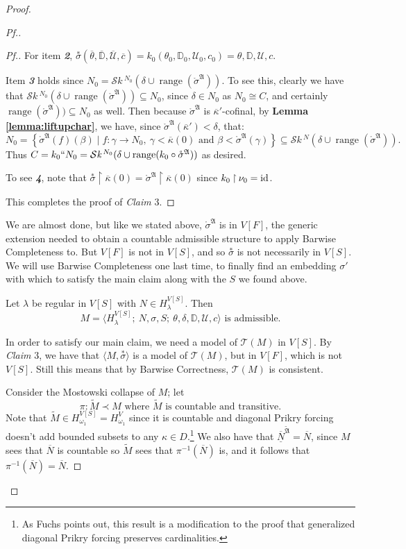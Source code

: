 \documentclass{amsart}
\theoremstyle{definition}
\theoremstyle{remark}
\newcommand{\D}{\mathbb{D}}
\newcommand{\N}{{\overline{N}}}
\newcommand{\U}{\mathcal{U}}
\newcommand{\id}{\textup{\ensuremath{\text{id}}}}
\DeclareMathOperator{\ran}{range}
\newcommand{\st}{\; | \;}
\newcommand{\set}[2]{\left\{#1\st #2 \right\}}
\newcommand{\rest}{\mathbin{\upharpoonright}}
\newcommand{\SH}{\mathcal{S}\textit{k} \,}
\newcommand{\sk}[3]{\SH^{#1}( {#2} \cup {\ran(#3)} ) }
\begin{document}
\begin{proof}
\begin{proof}[Pf.]
\begin{proof}[Pf.]
For item \textsl{\textbf{2}}, $\overset{*} {\sigma}(\overline \theta, \overline{\D}, \overline{\U}, \overline c)= k_0(\theta_0, \D_0, \U_0, c_0) =\theta, \D, \U, c$.

Item \textsl{\textbf{3}} holds since $N_0 = \sk{N_0}{\delta}{\mathring \sigma^{\mathfrak A}}$. To see this, clearly we have that $\sk{N_0}{\delta}{\mathring \sigma^{\mathfrak A}} \subseteq N_0$, since $\delta \in N_0$ as $N_0 \cong C$, and certainly $\ran(\mathring \sigma^{\mathfrak A})) \subseteq N_0$ as well. Then because $\mathring \sigma^{\mathfrak A}$ is $\overline \kappa'$-cofinal, by \textbf{Lemma \ref{lemma:liftupchar}}, we have, since $\mathring \sigma^{\mathfrak A}(\overline \kappa') < \delta$, that:
$$N_0 = \set{\mathring \sigma^{\mathfrak A}(f)(\beta)}{ f: \gamma \longrightarrow N_0, \ \gamma < \overline \kappa(0) \text{ and } \beta < \mathring \sigma^{\mathfrak A}(\gamma) } \subseteq \sk{N}{\delta}{\mathring \sigma^{\mathfrak A}}.$$
Thus $C = k_0``N_0=\sk{N_0}{\delta}{k_0 \circ \mathring \sigma^{\mathfrak A}}$ as desired. 

To see \textsl{\textbf{4}}, note that $\overset{*} {\sigma} \rest \overline \kappa(0) = \mathring{\sigma}^{\mathfrak A} \rest \overline \kappa(0)$ since $k_0 \rest \nu_0 = \id$.

This completes the proof of \textit{Claim} 3.
\end{proof}

We are almost done, but like we stated above, $\mathring{\sigma}^{\mathfrak A}$ is in $V[F]$, the generic extension needed to obtain a countable admissible structure to apply Barwise Completeness to. But $V[F]$ is not in $V[S]$, and so $\overset{*} {\sigma}$ is not necessarily in $V[S]$. We will use Barwise Completeness one last time, to finally find an embedding $\sigma'$ with which to satisfy the main claim along with the $S$ we found above.

Let $\lambda$ be regular in $V[S]$ with $N \in H_\lambda^{V[S]}$. Then 
	$$M = \langle H^{V[S]}_\lambda;\ N, \sigma, S;\ \theta, \delta, \D, \U, c \rangle \text{ is admissible.}$$

In order to satisfy our main claim, we need a model of $\mathcal T(M)$ in $V[S]$. By \textit{Claim} 3, we have that $\langle M , \overset{*} {\sigma}\rangle$ is a model of $\mathcal T(M)$, but in $V[F]$, which is not $V[S]$. Still this means that by Barwise Correctness, $\mathcal T(M)$ is consistent.
 
Consider the Mostowski collapse of $M$; let 
	$$\pi: \tilde M \prec M \text{ where $\tilde M$ is countable and transitive.}$$
Note that $\tilde M \in H_{\omega_1}^{V[S]}=H_{\omega_1}^V$ since it is countable and diagonal Prikry forcing doesn't add bounded subsets to any $\kappa \in D$.\footnote{As Fuchs \cite{Fuchs:2005kx} points out, this result is a modification to the proof that generalized diagonal Prikry forcing preserves cardinalities.} We also have that $\overline{\underline N}^{\tilde{\mathfrak A}} = \N$, since $M$ sees that $\N$ is countable so $\tilde{M}$ sees that $\pi^{-1}(\N)$ is, and it follows that $\pi^{-1}(\N)=\N$.


\end{proof}
\end{proof}
\end{document}
